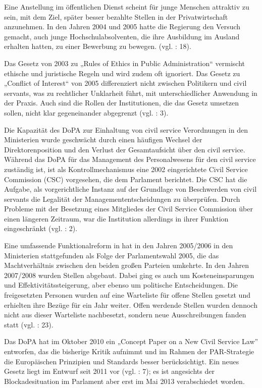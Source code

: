 Eine Anstellung im öffentlichen Dienst scheint für junge Menschen attraktiv zu sein, mit dem Ziel, später besser bezahlte Stellen in der Privatwirtschaft anzunehmen. In den Jahren 2004 und 2005 hatte die Regierung den Versuch gemacht, auch junge Hochschulabsolventen, die ihre Ausbildung im Ausland erhalten hatten, zu einer Bewerbung zu bewegen. (vgl. \cite{oecd09} : 18).\par
Das Gesetz von 2003 zu „Rules of Ethics in Public Administration“ vermischt ethische und juristische Regeln und wird zudem oft ignoriert. Das Gesetz zu „Conflict of Interest“ von 2005 differenziert nicht zwischen Politikern und civil servants, was zu rechtlicher Unklarheit führt, mit unterschiedlicher Anwendung in der Praxis. Auch sind die Rollen der Institutionen, die das Gesetz umsetzen sollen, nicht klar gegeneinander abgegrenzt (vgl. \cite{oecd09} : 3). \par
Die Kapazität des DoPA zur Einhaltung von civil service Verordnungen in den Ministerien wurde geschwächt durch einen häufigen Wechsel der Direktorenposition und den Verlust der Gesamtaufsicht über den civil service. Während das DoPA für das Management des Personalwesens für den civil service zuständig ist, ist als Kontrollmechanismus eine 2002 eingerichtete Civil Service Commission (CSC) vorgesehen, die dem Parlament berichtet. Die CSC hat die Aufgabe, als vorgerichtliche Instanz auf der Grundlage von Beschwerden von civil servants die Legalität der Managemententscheidungen zu überprüfen. Durch Probleme mit der Besetzung eines Mitgliedes der Civil Service Commission über einen längeren Zeitraum, war die Institution allerdings in ihrer Funktion eingeschränkt (vgl. \cite{oecd10b} : 2).\par
Eine umfassende Funktionalreform in hat in den Jahren 2005/2006 in den Ministerien stattgefunden als Folge der Parlamentswahl 2005, die das Machtverhältnis zwischen den beiden großen Parteien umkehrte. In den Jahren 2007/2008 wurden Stellen abgebaut. Dabei ging es auch um Kosteneinsparungen und Effektivitätssteigerung, aber ebenso um politische Entscheidungen. Die freigesetzten Personen wurden auf eine Warteliste für offene Stellen gesetzt und erhielten ihre Bezüge für ein Jahr weiter. Offen werdende Stellen wurden dennoch nicht aus dieser Warteliste nachbesetzt, sondern neue Ausschreibungen fanden statt (vgl.  \cite{oecd09} : 23).\par
Das DoPA hat im Oktober 2010 ein „Concept Paper on a New Civil Service Law” entworfen, das die bisherige Kritik aufnimmt und im Rahmen der PAR-Strategie die Europäischen Prinzipien und Standards besser berücksichtigt. Ein neues Gesetz liegt im Entwurf seit 2011 vor (vgl. \cite{oecd11b} : 7); es ist angesichts der Blockadesituation im Parlament aber erst im Mai 2013 verabschiedet worden.\par
